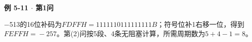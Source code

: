 {\color{ink}\bfseries 例 5-11 \(\cdot \) 第1问}\par\vspace{1bp}\(-\)513的16位补码为\(FDFFH=\allowbreak{}1111 1101 1111 1111B\)；符号位补1右移一位，得到\(FEFFH=\allowbreak{}-257\)。第(2)问按5段、4条无阻塞计算，所需周期数为\(5+\allowbreak{}4-1=\allowbreak{}8\)。
